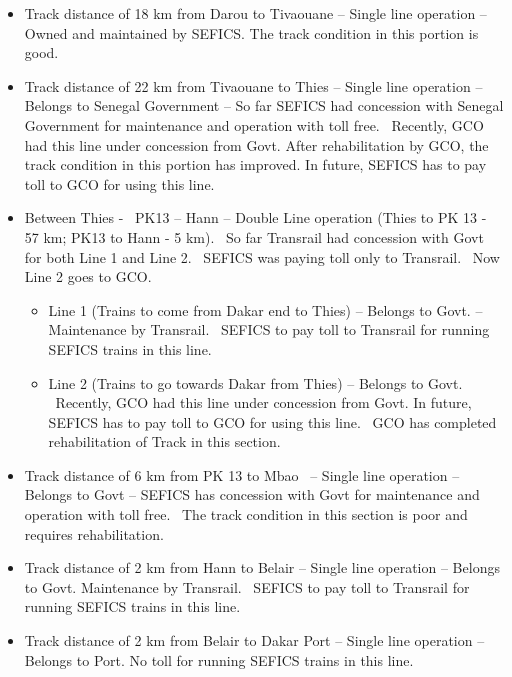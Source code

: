 \begin{itemize}
\item Track distance of 18 km from Darou to Tivaouane -- Single line operation -- Owned and maintained by SEFICS. The
track condition in this portion is good.
\item Track distance of 22 km from Tivaouane to Thies -- Single line operation -- Belongs to Senegal Government -- So
far SEFICS had concession with Senegal Government for maintenance and operation with toll free. \ Recently, GCO had
this line under concession from Govt. After rehabilitation by GCO, the track condition in this portion has improved.
In future, SEFICS has to pay toll to GCO for using this line.

\item Between Thies - \ PK13 -- Hann -- Double Line operation (Thies to PK 13 - 57 km; PK13 to Hann - 5 km). \ So far
Transrail had concession with Govt for both Line 1 and Line 2. \ SEFICS was paying toll only to Transrail. \ Now Line 2
goes to GCO.

\begin{itemize}
\item Line 1 (Trains to come from Dakar end to Thies) -- Belongs to Govt. -- Maintenance by Transrail. \ SEFICS to pay
toll to Transrail for running SEFICS trains in this line.
\item Line 2 (Trains to go towards Dakar from Thies) -- Belongs to Govt. \ Recently, GCO had this line under concession
from Govt. In future, SEFICS has to pay toll to GCO for using this line. \ GCO has completed rehabilitation of Track in
this section.
\end{itemize}

\item Track distance of 6 km from PK 13 to Mbao \ {}-- Single line operation -- Belongs to Govt -- SEFICS has concession
with Govt for maintenance and operation with toll free. \ The track condition in this section is poor and requires
rehabilitation.

\item Track distance of 2 km from Hann to Belair -- Single line operation -- Belongs to Govt. Maintenance by Transrail.
\ SEFICS to pay toll to Transrail for running SEFICS trains in this line.

\item Track distance of 2 km from Belair to Dakar Port -- Single line operation -- Belongs to Port. No toll for running
SEFICS trains in this line.
\end{itemize}




